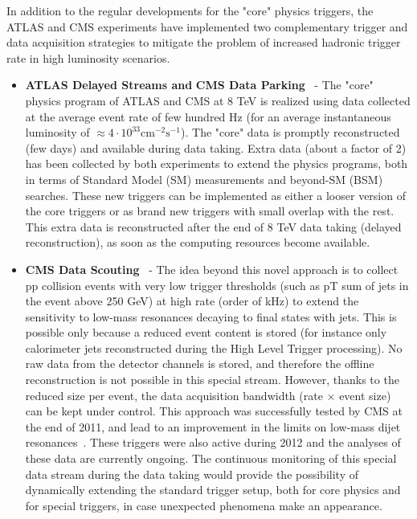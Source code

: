 \documentclass{PoS}
\begin{document}
In addition to the regular developments for the "core" physics triggers, the 
ATLAS and CMS experiments have implemented two complementary trigger and data 
acquisition strategies to mitigate the problem of increased 
hadronic trigger rate in high luminosity scenarios.
\begin{itemize}
\item {\bf ATLAS Delayed Streams and} {\bf CMS Data Parking}~\cite{CMS-DP-2012-022} - 
The "core" physics program of ATLAS and CMS  at 8 TeV is realized using data collected
at the average event rate of few hundred Hz (for an average instantaneous luminosity of 
$\approx 4 \cdot 10^{33} \mbox{cm}^{-2}\mbox{s}^{-1}$). 
The "core" data is promptly reconstructed (few days) and available during data taking. 
Extra data (about a factor of 2) has been collected by both experiments 
to extend the physics programs, both in terms of Standard Model (SM) 
measurements and beyond-SM (BSM) searches. 
These new triggers can be implemented as either a looser version of the core triggers
or as brand new triggers with small overlap with the rest. 
This extra data is reconstructed after the end of 8 TeV data 
taking (delayed reconstruction), as soon as the computing resources become available.
\item {\bf CMS Data Scouting}~\cite{CMS-DP-2012-022} - The idea beyond this novel approach 
is to collect pp collision events with very low trigger thresholds (such as pT sum 
of jets in the event above 250 GeV) at high rate (order of kHz) 
to extend the sensitivity to low-mass resonances decaying to final 
states with jets. This is possible only because a reduced event content 
is stored (for instance only calorimeter jets reconstructed during the High Level Trigger processing). 
No raw data from the detector channels is stored, and therefore the offline reconstruction 
is not possible in this special stream. However, thanks to the reduced size per event, 
the data acquisition bandwidth (rate $\times$ event size) can be kept
under control. This approach was successfully tested by CMS at the end of 2011, 
and lead to an improvement in the limits on low-mass dijet resonances~\cite{CMS-PAS-EXO-11-094}. 
These triggers were also active during 2012 and the analyses of these data 
are currently ongoing. The continuous monitoring of this special data stream during the 
data taking would provide the possibility of dynamically extending the standard trigger 
setup, both for core physics and for special triggers, in case unexpected phenomena make an appearance. 
\end{itemize}
\end{document}
